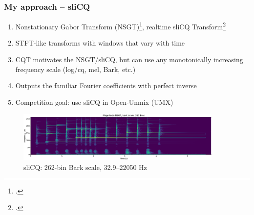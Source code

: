 \documentclass[usenames,dvipsnames]{beamer}
\begin{document}

\begin{frame}
	\frametitle{My approach -- sliCQ}
	\begin{enumerate}
	\item
		Nonstationary Gabor Transform (NSGT)\footcite{balazs}, realtime sliCQ Transform\footcite{invertiblecqt, slicq, variableq1}
	\item
		STFT-like transforms with windows that vary with time
	\item
		CQT motivates the NSGT/sliCQ, but can use any monotonically increasing frequency scale (log/cq, mel, Bark, etc.)
	\item
		Outputs the familiar Fourier coefficients with perfect inverse
	\item
		Competition goal: use sliCQ in Open-Unmix (UMX)
	\end{enumerate}
	\begin{figure}[ht]
		\centering
		\vspace{-0.5em}
		\includegraphics[height=2.5cm]{./images-gspi/gspi_xumx_slicq_params.png}
		\vspace{-0.5em}
		\caption{sliCQ: 262-bin Bark scale, 32.9--22050 Hz}
		\vspace{-0.5em}
	\end{figure}
\end{frame}
\end{document}

